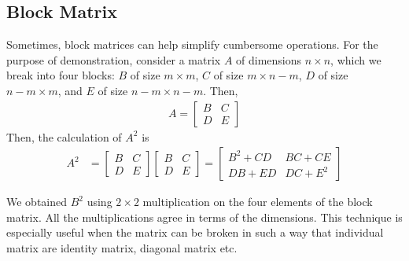 \documentclass[../../linear_algebra.tex]{subfiles}
\begin{document}
\subsection{Block Matrix}
Sometimes, block matrices can help simplify cumbersome operations. For the purpose of demonstration, consider a matrix $A$ of dimensions $n \times n$, which we break into four blocks: $B$ of size $m \times m$, $C$ of size $m \times n-m$, $D$ of size $n-m \times m$, and $E$ of size $n-m \times n-m$. Then,
\begin{align*}
    A = \begin{bmatrix}
        B &C\\ D &E
    \end{bmatrix}
\end{align*}
Then, the calculation of $A^{2}$ is
\begin{align*}
    A^{2} &= \begin{bmatrix}
        B &C\\ D &E
    \end{bmatrix}
    \begin{bmatrix}
        B &C\\ D &E
    \end{bmatrix} =
    \begin{bmatrix}
        B^{2} + CD &BC + CE\\ DB + ED &DC + E^{2}
    \end{bmatrix}
\end{align*}

We obtained $B^{2}$ using $2 \times 2$ multiplication on the four elements of the block matrix. All the multiplications agree in terms of the dimensions. This technique is especially useful when the matrix can be broken in such a way that individual matrix are identity matrix, diagonal matrix etc.
\end{document}
